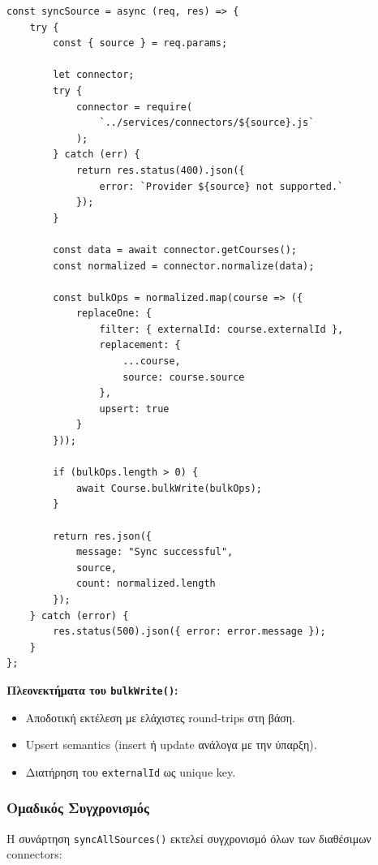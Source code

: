 \documentclass[a4paper,12pt]{article}
\begin{document}
\begin{verbatim}
const syncSource = async (req, res) => {
    try {
        const { source } = req.params;

        let connector;
        try {
            connector = require(
                `../services/connectors/${source}.js`
            );
        } catch (err) {
            return res.status(400).json({ 
                error: `Provider ${source} not supported.` 
            });
        }

        const data = await connector.getCourses();
        const normalized = connector.normalize(data);

        const bulkOps = normalized.map(course => ({
            replaceOne: {
                filter: { externalId: course.externalId },
                replacement: {
                    ...course,
                    source: course.source
                },
                upsert: true
            }
        }));
        
        if (bulkOps.length > 0) {
            await Course.bulkWrite(bulkOps);
        }

        return res.json({ 
            message: "Sync successful", 
            source, 
            count: normalized.length 
        });
    } catch (error) {
        res.status(500).json({ error: error.message });
    }
};
\end{verbatim}

\textbf{Πλεονεκτήματα του \texttt{bulkWrite()}:}
\begin{itemize}
    \item Αποδοτική εκτέλεση με ελάχιστες round-trips στη βάση.
    \item Upsert semantics (insert ή update ανάλογα με την ύπαρξη).
    \item Διατήρηση του \texttt{externalId} ως unique key.
\end{itemize}

\subsubsection{Ομαδικός Συγχρονισμός}

Η συνάρτηση \texttt{syncAllSources()} εκτελεί συγχρονισμό όλων των διαθέσιμων connectors:
\end{document}
